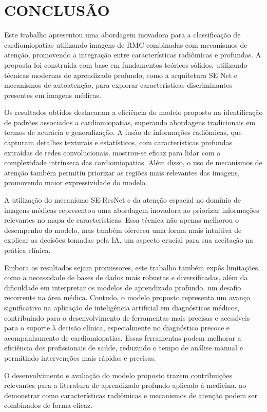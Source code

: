 \chapter{CONCLUSÃO}
\label{chap:cap7_conclusao}

Este trabalho apresentou uma abordagem inovadora para a classificação de cardiomiopatias utilizando imagens de \gls{RMC} combinadas com mecanismos de atenção, promovendo a integração entre características radiômicas e profundas. A proposta foi construída com base em fundamentos teóricos sólidos, utilizando técnicas modernas de aprendizado profundo, como a arquitetura \gls{SE} Net e mecanismos de autoatenção, para explorar características discriminantes presentes em imagens médicas.

Os resultados obtidos destacaram a eficiência do modelo proposto na identificação de padrões associados a cardiomiopatias, superando abordagens tradicionais em termos de acurácia e generalização. A fusão de informações radiômicas, que capturam detalhes texturais e estatísticos, com características profundas extraídas de redes convolucionais, mostrou-se eficaz para lidar com a complexidade intrínseca das cardiomiopatias. Além disso, o uso de mecanismos de atenção também permitiu priorizar as regiões mais relevantes das imagens, promovendo maior expressividade do modelo.

A utilização do mecanismo SE-ResNet e da atenção espacial no domínio de imagens médicas representou uma abordagem inovadora ao priorizar informações relevantes no mapa de características. Essa técnica não apenas melhorou o desempenho do modelo, mas também ofereceu uma forma mais intuitiva de explicar as decisões tomadas pela IA, um aspecto crucial para sua aceitação na prática clínica.

Embora os resultados sejam promissores, este trabalho também expôs limitações, como a necessidade de bases de dados mais robustas e diversificadas, além da dificuldade em interpretar os modelos de aprendizado profundo, um desafio recorrente na área médica. Contudo, o modelo proposto representa um avanço significativo na aplicação de inteligência artificial em diagnósticos médicos, contribuindo para o desenvolvimento de ferramentas mais precisas e acessíveis para o suporte à decisão clínica, especialmente no diagnóstico precoce e acompanhamento de cardiomiopatias. Essas ferramentas podem melhorar a eficiência dos profissionais de saúde, reduzindo o tempo de análise manual e permitindo intervenções mais rápidas e precisas.

O desenvolvimento e avaliação do modelo proposto trazem contribuições relevantes para a literatura de aprendizado profundo aplicado à medicina, ao demonstrar como características radiômicas e mecanismos de atenção podem ser combinados de forma eficaz. 

